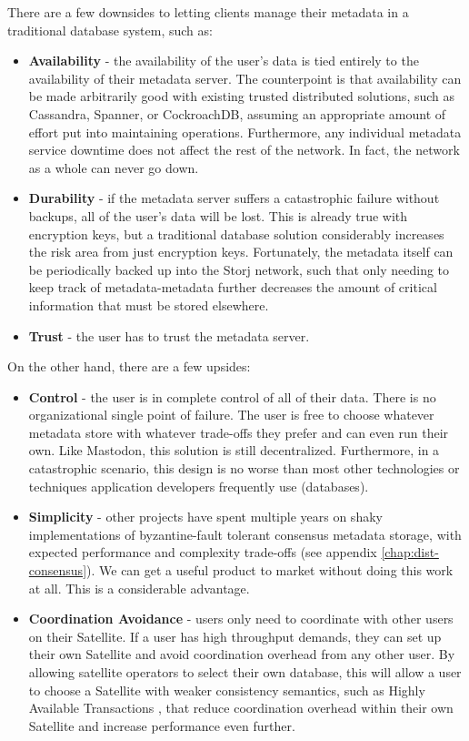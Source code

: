 \documentclass[8pt,fleqn,openany]{book}
\begin{document}
There are a few downsides to letting clients manage their metadata in a
traditional database system, such as:
\begin{itemize}
\item {\bf Availability} - the availability of the user's data
is tied entirely to the availability of their metadata server. The counterpoint
is that availability can be made arbitrarily good with existing trusted
distributed solutions, such as Cassandra, Spanner, or CockroachDB, assuming an
appropriate amount of effort put into maintaining operations. Furthermore, any
individual metadata service downtime does not affect the rest of the network. In
fact, the network as a whole can never go down.
\item {\bf Durability} -
if the metadata server suffers a catastrophic failure without backups, all of
the user's data will be lost. This is already true with encryption keys,
but a traditional database solution considerably increases the risk area from just
encryption keys. Fortunately, the metadata itself can be periodically backed
up into the Storj network,
such that only needing to keep track of metadata-metadata
further decreases the amount of critical information that must be stored
elsewhere.
\item {\bf Trust} - the user has to trust the metadata server.
\end{itemize}

On the other hand, there are a few upsides:
\begin{itemize}
\item {\bf Control} - the user is in complete control of all of their data.
  There is no organizational single point of failure. The user is free
  to choose whatever metadata store with whatever trade-offs they prefer and
  can even run their own. Like
  Mastodon\cite{mastodon}, this solution is still decentralized. Furthermore, in a
  catastrophic scenario, this design is no worse than most other technologies or
  techniques application developers frequently use (databases).
\item {\bf Simplicity} - other projects have spent multiple years on shaky
  implementations of byzantine-fault tolerant consensus metadata storage,
  with expected performance and complexity trade-offs
  (see appendix \ref{chap:dist-consensus}).
  We can get a useful product to market without doing this work at all.
  This is a considerable advantage.
\item {\bf Coordination Avoidance} - users only need to coordinate with
  other users on their Satellite. If a user has high throughput demands,
  they can set up their own Satellite and avoid coordination overhead from
  any other user. By allowing satellite operators to select their own database,
  this will allow a user to choose a Satellite with weaker consistency
  semantics, such as Highly Available Transactions \cite{hat}, that reduce
  coordination overhead within their own Satellite and increase performance
  even further.
\end{itemize}
\end{document}
